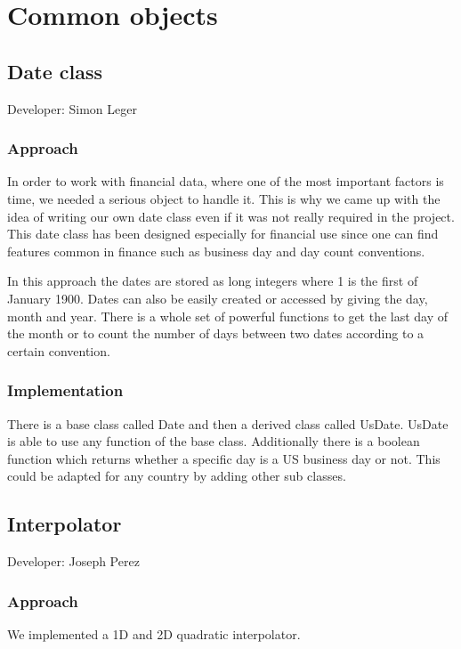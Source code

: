 \chapter{Common objects}

\section{Date class}

Developer: Simon Leger

\subsection{Approach}

In order to work with financial data, where one of the most important factors is time, we 
needed a serious object to handle it.  This is why we came up with the idea of writing our own date class 
even if it was not really required in the project. This date class has been designed especially for financial use 
since one can find features common in finance such as business day and day count conventions.

In this approach the dates are stored as long integers where 1 is the first of January 1900.  Dates can also be easily created or accessed by giving the day, month and year. There is a whole set of powerful functions to get the last day of the month or to count the number of days 
between two dates according to a certain convention.

\subsection{Implementation}

There is a base class called Date and then a derived class called UsDate.  UsDate is able to use any function of the base 
class.  Additionally there is a boolean function which returns whether a specific day is a US business day or not. 
This could be adapted for any country by adding other sub classes.


\section{Interpolator}

Developer: Joseph Perez

\subsection{Approach}
We implemented a 1D and 2D quadratic interpolator.

